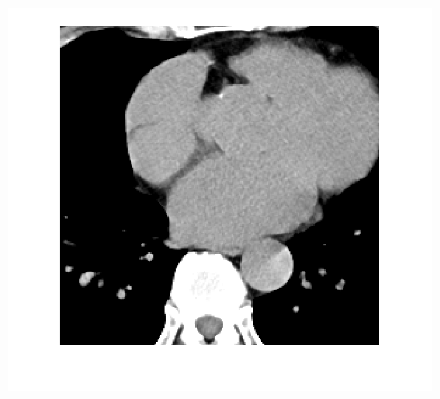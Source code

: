 \documentclass[hyperref]{ctexart}
\begin{document}
{\begin{figure}[htbp]
{				\includegraphics[scale=0.2]{111-1.png}
			}
			\quad
			\quad
			\subfigure[pic1.]{
}
\end{figure}}
\end{document}
